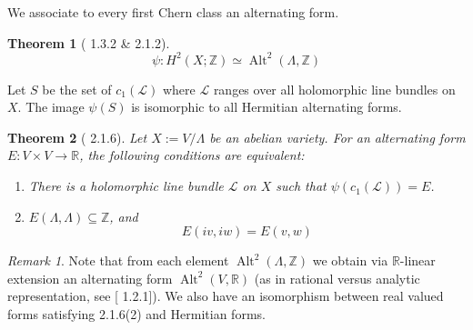 \documentclass[12pt,reqno]{amsart}
\DeclareMathOperator{\Alt}{Alt}
\newcommand{\Z}{\mathbb{Z}}
\newcommand{\R}{\mathbb{R}}
\newcommand{\mc}{\mathcal}
\newtheorem*{thm*}{Theorem}
\theoremstyle{definition}
\theoremstyle{remark}
\newtheorem*{remark}{Remark}
\newcommand{\ti}{\todo[inline]}
\begin{document}

We associate to every first Chern class an alternating form.

\begin{thm*} [\cite{bl} 1.3.2 \& 2.1.2] $$\psi: H^2(X; \Z) \simeq \Alt^2(\Lambda, \Z)$$ 
\end{thm*} 




 
 
Let $S$ be the set of $c_1(\mc{L})$ where $\mc{L}$ ranges over all holomorphic line bundles on $X$. The image $\psi(S)$ is isomorphic to all Hermitian alternating forms.




\begin{thm*} [\cite{BL} 2.1.6] Let $X:= V/\Lambda$ be an abelian variety. For an alternating form $E: V \times V \to \R$, the following conditions are equivalent: 

\begin{enumerate} 
\item There is a holomorphic line bundle $\mc{L}$ on $X$ such that $\psi(c_1(\mc{L}))= E$. 
\item $E(\Lambda, \Lambda) \subseteq \Z$, and $$E(iv, iw) = E(v, w)$$
\end{enumerate}
\end{thm*} 

 
\begin{remark} Note that from each element $\Alt^2(\Lambda, \Z)$ we obtain via $\R$-linear extension an alternating form $\Alt^2(V, \R)$ (as in rational versus analytic representation, see [\cite{bl} 1.2.1]). We also have an isomorphism between real valued forms satisfying 2.1.6(2) and Hermitian forms. \end{remark}
\end{document}
